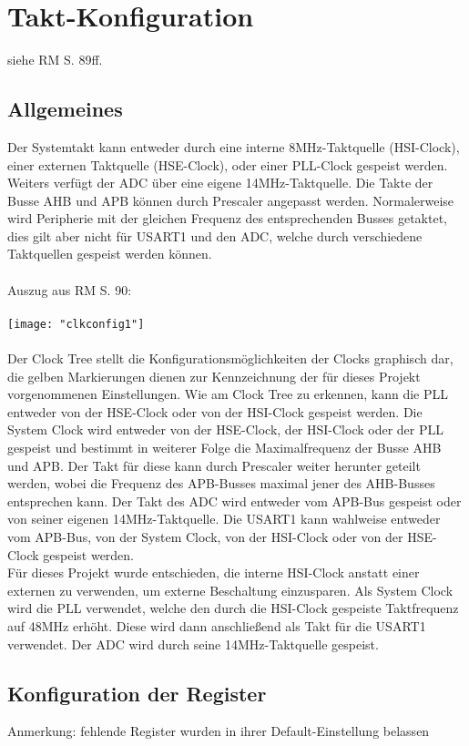 \documentclass[11pt]{report}
\begin{document}
	\section{Takt-Konfiguration}
		\label{sec:clkconfig}
		siehe RM S. 89ff.\\
		\subsection{Allgemeines}
			 Der Systemtakt kann entweder durch eine interne 8MHz-Taktquelle (HSI-Clock), einer externen Taktquelle (HSE-Clock), oder einer PLL-Clock gespeist werden. Weiters verfügt der ADC über eine eigene 14MHz-Taktquelle. Die Takte der Busse AHB und APB können durch Prescaler angepasst werden. Normalerweise wird Peripherie mit der gleichen Frequenz des entsprechenden Busses getaktet, dies gilt aber nicht für USART1 und den ADC, welche durch verschiedene Taktquellen gespeist werden können.\\
			\\Auszug aus RM S. 90:\\
			\\\texttt{[image: "clkconfig1"]}\\
			\\Der Clock Tree stellt die Konfigurationsmöglichkeiten der Clocks graphisch dar, die gelben Markierungen dienen zur Kennzeichnung der für dieses Projekt vorgenommenen Einstellungen. Wie am Clock Tree zu erkennen, kann die PLL entweder von der HSE-Clock oder von der HSI-Clock gespeist werden. Die System Clock wird entweder von der HSE-Clock, der HSI-Clock oder der PLL gespeist und bestimmt in weiterer Folge die Maximalfrequenz der Busse AHB und APB. Der Takt für diese kann durch Prescaler weiter herunter geteilt werden, wobei die Frequenz des APB-Busses maximal jener des AHB-Busses entsprechen kann. Der Takt des ADC wird entweder vom APB-Bus gespeist oder von seiner eigenen 14MHz-Taktquelle. Die USART1 kann wahlweise entweder vom APB-Bus, von der System Clock, von der HSI-Clock oder von der HSE-Clock gespeist werden.\\
			Für dieses Projekt wurde entschieden, die interne HSI-Clock anstatt einer externen zu verwenden, um externe Beschaltung einzusparen. Als System Clock wird die PLL verwendet, welche den durch die HSI-Clock gespeiste Taktfrequenz auf 48MHz erhöht. Diese wird dann anschließend als Takt für die USART1 verwendet. Der ADC wird durch seine 14MHz-Taktquelle gespeist.
		\subsection{Konfiguration der Register}
			Anmerkung: fehlende Register wurden in ihrer Default-Einstellung belassen
\end{document}
